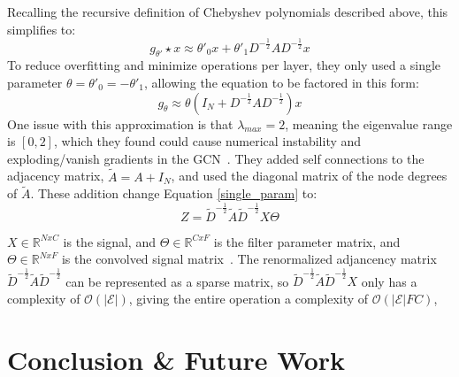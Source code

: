\documentclass{article}
\begin{document}
Recalling the recursive definition of Chebyshev polynomials described above, this simplifies to:
\begin{equation}
\label{simplified_1stcheby}
g_{\theta'} \star x \approx \theta'_0x + \theta'_1 D^{-\frac{1}{2}}AD^{-\frac{1}{2}}x 
\end{equation}
To reduce overfitting and minimize operations per layer, they only used a single parameter $\theta = \theta'_0 = -\theta'_1$, allowing the equation to be factored in this form:
\begin{equation}
\label{single_param}
g_\theta \approx \theta(I_N + D^{-\frac{1}{2}}AD^{-\frac{1}{2}})x
\end{equation}
One issue with this approximation is that $\lambda_{max} = 2$, meaning the eigenvalue range is $[0,2]$, which they found could cause numerical instability and exploding/vanish gradients in the GCN~\cite{Kipf2016}.  They added self connections to the adjacency matrix, $\tilde{A} = A + I_N$, and used the diagonal matrix of the node degrees of $\tilde{A}$.  These addition change Equation \ref{single_param} to:
\begin{equation}
\label{renormalized}
Z = \tilde{D}^{-\frac{1}{2}}\tilde{A}\tilde{D}^{-\frac{1}{2}}X\Theta
\end{equation}

$X \in \mathbb{R}^{N x C}$ is the signal, and $\Theta \in \mathbb{R}^{C x F}$ is the filter parameter matrix, and $\Theta \in \mathbb{R}^{N x F}$ is the convolved signal matrix~\cite{Kipf2016}. The renormalized adjancency matrix $\tilde{D}^{-\frac{1}{2}}\tilde{A}\tilde{D}^{-\frac{1}{2}}$ can be represented as a sparse matrix, so $\tilde{D}^{-\frac{1}{2}}\tilde{A}\tilde{D}^{-\frac{1}{2}}X$ only has a complexity of $\mathcal{O}(|\mathcal{E}|)$, giving the entire operation a complexity of $\mathcal{O}(|\mathcal{E}|FC)$,




\section{Conclusion \& Future Work}



\end{document}
